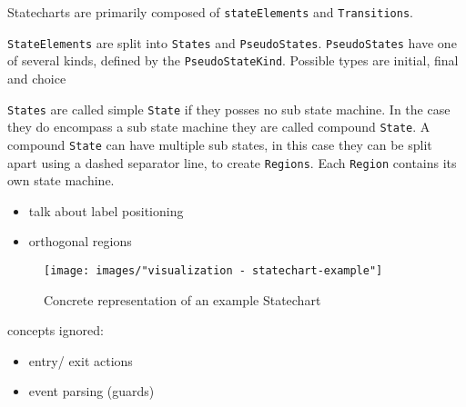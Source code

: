 Statecharts are primarily composed of \texttt{stateElements} and \texttt{Transitions}.

\texttt{StateElements} are split into \texttt{States} and \texttt{PseudoStates}. \texttt{PseudoStates} have one of several kinds, defined by the \texttt{PseudoStateKind}. Possible types are initial, final and choice


\texttt{States} are called simple \texttt{State} if they posses no sub state machine. In the case they do encompass a sub state machine they are called compound \texttt{State}. A compound \texttt{State} can have multiple sub states, in this case they can be split apart using a dashed separator line, to create \texttt{Regions}. Each \texttt{Region} contains its own state machine.


\begin{itemize}
  \item talk about label positioning
  \item orthogonal regions
\end{itemize}


\begin{figure}
\centering
\texttt{[image: images/"visualization - statechart-example"]}
\caption{Concrete representation of an example Statechart}
\label{fig:statechart-example}
\end{figure}

concepts ignored:
\begin{itemize}
  \item entry/ exit actions
  \item event parsing (guards)
\end{itemize}

